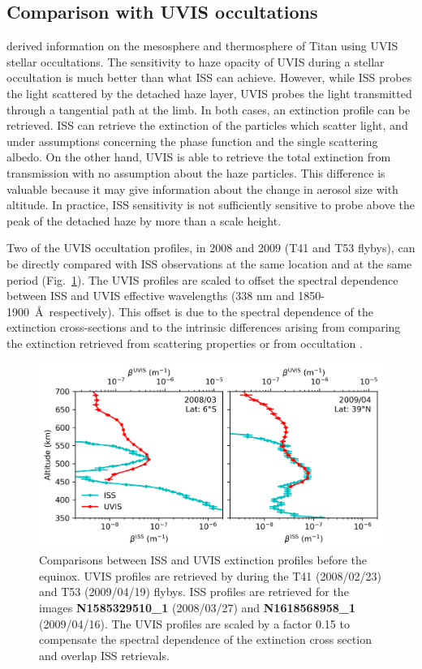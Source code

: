 \subsection{Comparison with UVIS occultations}

\cite{Koskinen2011} derived information on the mesosphere and thermosphere of Titan using UVIS stellar
occultations. The sensitivity to haze opacity of UVIS during a stellar occultation is much better than what ISS can achieve. However,
while ISS probes the light scattered by the detached haze layer, UVIS probes the light transmitted through a tangential
path at the limb. In both cases, an extinction profile can be retrieved. ISS can retrieve the extinction of the
particles which scatter light, and under assumptions concerning the phase function and the single scattering albedo.
On the other hand, UVIS is able to retrieve the total extinction from transmission with no assumption about the haze
particles. This difference is valuable because it may give information about the change in aerosol
size with altitude. In practice, ISS sensitivity is not sufficiently sensitive to probe above
the peak of the detached haze by more than a scale height.

Two of the UVIS occultation profiles, in 2008 and 2009 (T41 and T53 flybys), can be directly compared with ISS
observations at the same location and at the same period (Fig.~\ref{fig:uvis_iss}). The UVIS profiles are scaled to
offset the spectral dependence between ISS and UVIS effective wavelengths (338 nm and 1850-1900~\AA~respectively).
This offset is due to the spectral dependence of the extinction cross-sections and to the intrinsic
differences arising from comparing the extinction retrieved from scattering properties or from occultation
\citep[see.][]{Cours2011}.

\begin{figure}[!ht]
    \centering
    \includegraphics[width=.8\textwidth]{Fig/UVIS_ISS.png}
    \caption[UVIS comparison]{Comparisons between ISS and UVIS extinction profiles before the equinox.
            UVIS profiles are retrieved by \cite{Koskinen2011} during the T41 (2008/02/23) and T53 (2009/04/19) flybys.
            ISS profiles are retrieved for the images \textbf{N1585329510\_1} (2008/03/27) and
            \textbf{N1618568958\_1} (2009/04/16).
            The UVIS profiles are scaled by a factor 0.15 to compensate the spectral dependence of the extinction
            cross section and overlap ISS retrievals.}
    \label{fig:uvis_iss}
\end{figure}

